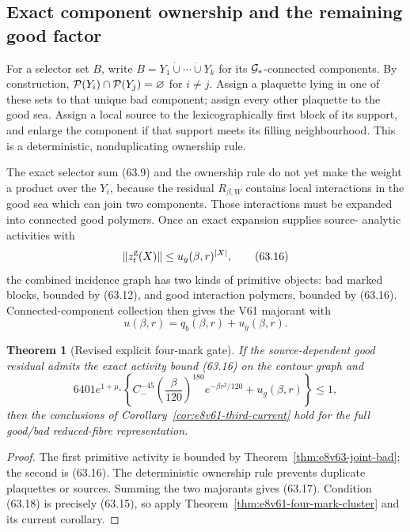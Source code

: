 \documentclass[11pt,oneside]{book}
\newtheorem{theorem}{Theorem}[chapter]
\theoremstyle{definition}
\theoremstyle{remark}
\begin{document}
\subsection{Exact component ownership and the remaining good factor}

For a selector set \(B\), write
\(B=Y_1\mathbin{\dot\cup}\cdots\mathbin{\dot\cup}Y_k\) for its
\({\cal G}_*\)-connected components.  By construction,
\({\cal P}(Y_i)\cap{\cal P}(Y_j)=\varnothing\) for \(i\ne j\).
Assign a plaquette lying in one of these sets to that unique bad
component; assign every other plaquette to the good sea.  Assign a
local source to the lexicographically first block of its support,
and enlarge the component if that support meets its filling
neighbourhood.  This is a deterministic, nonduplicating ownership
rule.

The exact selector sum (63.9) and the ownership rule do not yet make
the weight a product over the \(Y_i\), because the residual
\(R_{\beta,W}\) contains local interactions in the good sea which
can join two components.  Those interactions must be expanded into
connected good polymers.  Once an exact expansion supplies source-
analytic activities with
\[
                         \|z^{\rm g}_t(X)\|
                         \le u_g(\beta,r)^{|X|},              \tag{63.16}
\]
the combined incidence graph has two kinds of primitive objects:
bad marked blocks, bounded by (63.12), and good interaction
polymers, bounded by (63.16).  Connected-component collection then
gives the V61 majorant with
\[
                         u(\beta,r)
                         =q_b(\beta,r)+u_g(\beta,r).          \tag{63.17}
\]

\begin{theorem}[Revised explicit four-mark gate]
\label{thm:e8v63-revised-gate}
If the source-dependent good residual admits the exact activity
bound (63.16) on the contour graph and
\[
\boxed{
 6401e^{1+\mu_*}
 \left\{
 C_-^{-45}\left(\frac\beta{120}\right)^{180}
 e^{-\beta r^2/120}
 +u_g(\beta,r)\right\}\le1,}                                \tag{63.18}
\]
then the conclusions of
Corollary~\ref{cor:e8v61-third-current} hold for the full
good/bad reduced-fibre representation.
\end{theorem}

\begin{proof}
The first primitive activity is bounded by
Theorem~\ref{thm:e8v63-joint-bad}; the second is (63.16).
The deterministic ownership rule prevents duplicate plaquettes or
sources.  Summing the two majorants gives (63.17).  Condition
(63.18) is precisely (63.15), so apply
Theorem~\ref{thm:e8v61-four-mark-cluster} and its current
corollary.
\end{proof}
\end{document}
